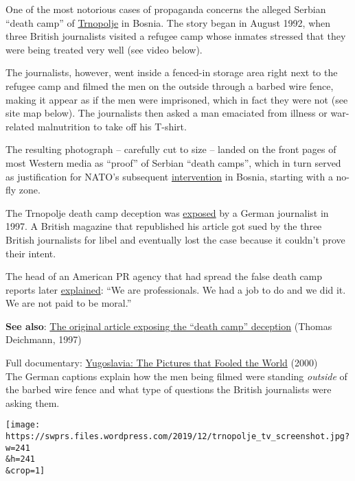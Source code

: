 One of the most notorious cases of propaganda concerns the alleged
Serbian ``death camp'' of
\href{https://en.wikipedia.org/wiki/Trnopolje_camp}{Trnopolje} in
Bosnia. The story began in August 1992, when three British journalists
visited a refugee camp whose inmates stressed that they were being
treated very well (see video below).

The journalists, however, went inside a fenced-in storage area right
next to the refugee camp and filmed the men on the outside through a
barbed wire fence, making it appear as if the men were imprisoned, which
in fact they were not (see site map below). The journalists then asked a
man emaciated from illness or war-related malnutrition to take off his
T-shirt.

The resulting photograph -- carefully cut to size -- landed on the front
pages of most Western media as ``proof'' of Serbian ``death camps'',
which in turn served as justification for NATO's subsequent
\href{https://en.wikipedia.org/wiki/NATO_intervention_in_Bosnia_and_Herzegovina}{intervention}
in Bosnia, starting with a no-fly zone.

The Trnopolje death camp deception was
\href{https://swprs.files.wordpress.com/2019/12/the-picture-that-fooled-the-world_thomas-deichmann_1997.pdf}{exposed}
by a German journalist in 1997. A British magazine that republished his
article got sued by the three British journalists for libel and
eventually lost the case because it couldn't prove their intent.

The head of an American PR agency that had spread the false death camp
reports later
\href{https://www.sourcewatch.org/index.php/James_Harff}{explained}:
``We are professionals. We had a job to do and we did it. We are not
paid to be moral.''

\textbf{See also}:
\href{https://swprs.files.wordpress.com/2019/12/the-picture-that-fooled-the-world_thomas-deichmann_1997.pdf}{The
original article exposing the ``death camp'' deception} (Thomas
Deichmann, 1997)

Full documentary:
\href{https://www.youtube.com/watch?v=xtQ-PJLIpcE}{Yugoslavia: The
Pictures that Fooled the World} (2000)\\
The German captions explain how the men being filmed were standing
\emph{outside} of the barbed wire fence and what type of questions the
British journalists were asking them.

\href{https://swprs.files.wordpress.com/2019/12/trnopolje_tv_screenshot.jpg}{}

\texttt{[image: https://swprs.files.wordpress.com/2019/12/trnopolje\_tv\_screenshot.jpg?w=241\\\&h=241\\\&crop=1]}

